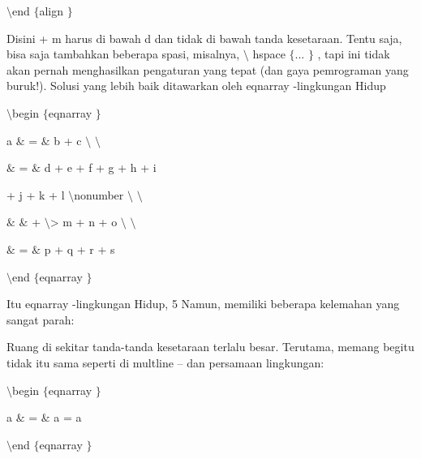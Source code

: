 \noindent 
 $  \setminus  $end $  \{  $align $  \}  $ \par
\vspace{12pt}
\noindent 
Disini + m harus di bawah d dan tidak di bawah tanda kesetaraan. Tentu saja, bisa saja tambahkan beberapa spasi, misalnya,  $  \setminus  $ hspace  $  \{  $... $  \}  $ , tapi ini tidak akan pernah menghasilkan pengaturan yang tepat (dan gaya pemrograman yang buruk!). Solusi yang lebih baik ditawarkan oleh eqnarray -lingkungan Hidup \par
\vspace{12pt}
\noindent 
 $  \setminus  $begin $  \{  $eqnarray $  \}  $ \par
\vspace{12pt}
\noindent 
a  $  \&  $ =  $  \&  $ b + c  $  \setminus  $ $  \setminus  $ \par
\vspace{12pt}
\noindent 
 $  \&  $ =  $  \&  $ d + e + f + g + h + i \par
\vspace{12pt}
\noindent 
+ j + k + l  $  \setminus  $nonumber $  \setminus  $ $  \setminus  $ \par
\vspace{12pt}
\noindent 
 $  \&  $ $  \&  $ + $  \setminus  $> m + n + o  $  \setminus  $ $  \setminus  $ \par
\vspace{12pt}
\noindent 
 $  \&  $ =  $  \&  $ p + q + r + s \par
\vspace{12pt}
\noindent 
 $  \setminus  $end $  \{  $eqnarray $  \}  $ \par
\noindent 
\vspace{16pt}
\noindent 
Itu eqnarray -lingkungan Hidup, 5 Namun, memiliki beberapa kelemahan yang sangat parah: \par
\noindent 
 Ruang di sekitar tanda-tanda kesetaraan terlalu besar. Terutama, memang begitu tidak itu sama seperti di multline – dan persamaan lingkungan: \par
\vspace{12pt}
\noindent 
 $  \setminus  $begin $  \{  $eqnarray $  \}  $ \par
\vspace{12pt}
\noindent 
a  $  \&  $ =  $  \&  $ a = a \par
\vspace{12pt}
\noindent 
 $  \setminus  $end $  \{  $eqnarray $  \}  $ \par
\vspace{12pt}

